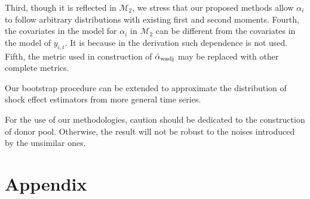 \documentclass[11pt]{article}
\def\mc#1{\mathcal{#1}} %
\theoremstyle{definition}
\begin{document}
Third, though it is reflected in $\mc{M}_2$, we stress that our proposed methods allow $\alpha_i$ to follow arbitrary distributions with existing first and second moments. Fourth, the covariates in the model for $\alpha_i$ in $\mc{M}_2$ can be different from the covariates in the model of $y_{i,t}$. It is because in the derivation such dependence is not used. Fifth, the metric used in construction of $\hat{\alpha}_{\rm wadj}$ may be replaced with other complete metrics.


Our bootstrap procedure can be extended to approximate the distribution of shock effect estimators from more general time series. %


For the use of our methodologies, caution should be dedicated to the construction of donor pool. Otherwise, the result will not be robust to the noises introduced by the unsimilar ones. 

\section{Appendix}
\end{document}
